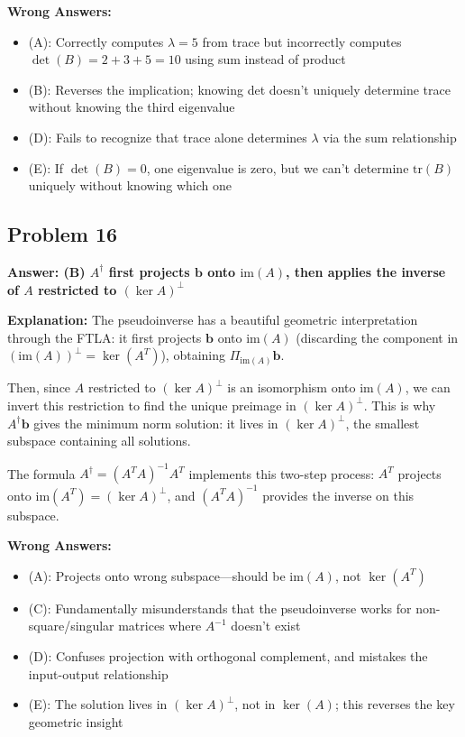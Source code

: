 \documentclass[12pt]{amsart}
\newcommand{\correct}[1]{{\color{correctgreen}\textbf{#1}}}
\begin{document}
{\textbf{Wrong Answers:}
\begin{itemize}
\item (A): Correctly computes $\lambda = 5$ from trace but incorrectly computes $\det(B) = 2 + 3 + 5 = 10$ using sum instead of product
\item (B): Reverses the implication; knowing det doesn't uniquely determine trace without knowing the third eigenvalue
\item (D): Fails to recognize that trace alone determines $\lambda$ via the sum relationship
\item (E): If $\det(B) = 0$, one eigenvalue is zero, but we can't determine $\text{tr}(B)$ uniquely without knowing which one
\end{itemize}

\subsection*{Problem 16}
\correct{Answer: (B) $A^{\dagger}$ first projects $\mathbf{b}$ onto $\text{im}(A)$, then applies the inverse of $A$ restricted to $(\ker A)^{\perp}$}

\textbf{Explanation:} The pseudoinverse has a beautiful geometric interpretation through the FTLA: it first projects $\mathbf{b}$ onto $\text{im}(A)$ (discarding the component in $(\text{im}(A))^{\perp} = \ker(A^T)$), obtaining $\Pi_{\text{im}(A)}\mathbf{b}$. 

Then, since $A$ restricted to $(\ker A)^{\perp}$ is an isomorphism onto $\text{im}(A)$, we can invert this restriction to find the unique preimage in $(\ker A)^{\perp}$. This is why $A^{\dagger}\mathbf{b}$ gives the minimum norm solution: it lives in $(\ker A)^{\perp}$, the smallest subspace containing all solutions. 

The formula $A^{\dagger} = (A^TA)^{-1}A^T$ implements this two-step process: $A^T$ projects onto $\text{im}(A^T) = (\ker A)^{\perp}$, and $(A^TA)^{-1}$ provides the inverse on this subspace.

\textbf{Wrong Answers:}
\begin{itemize}
\item (A): Projects onto wrong subspace—should be $\text{im}(A)$, not $\ker(A^T)$
\item (C): Fundamentally misunderstands that the pseudoinverse works for non-square/singular matrices where $A^{-1}$ doesn't exist
\item (D): Confuses projection with orthogonal complement, and mistakes the input-output relationship
\item (E): The solution lives in $(\ker A)^{\perp}$, not in $\ker(A)$; this reverses the key geometric insight
\end{itemize}

}
\end{document}
